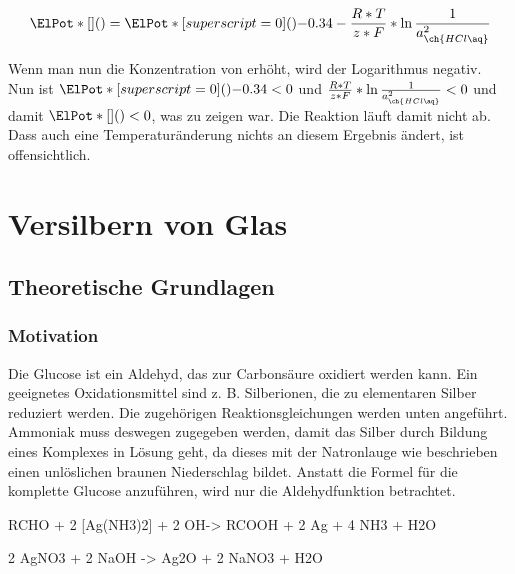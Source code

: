 \documentclass{article}
\begin{document}
      \begin{equation}
        \ElPot*[](){} = \ElPot*[superscript=0](){-0.34} - \frac{R*T}{z*F} * \ln {\frac{1}{a_{\ch{HCl\aq}}^2}} \label{eq:NernstzweiCu}
      \end{equation}
      
      Wenn man nun die Konzentration von  erhöht, wird der Logarithmus negativ. Nun ist $\ElPot*[superscript=0](){-0.34} < 0$ und $\frac{R*T}{z*F} * \ln {\frac{1}{a_{\ch{HCl\aq}}^2}} < 0$ und damit $\ElPot*[](){} < 0$, was zu zeigen war. Die Reaktion läuft damit nicht ab. Dass auch eine Temperaturänderung nichts an diesem Ergebnis ändert, ist offensichtlich.
      
  \pagebreak
  
  \section{Versilbern von Glas}
  
    \subsection{Theoretische Grundlagen}
      
      \subsubsection{Motivation}
      
        Die Glucose ist ein Aldehyd, das zur Carbonsäure oxidiert werden kann. Ein geeignetes Oxidationsmittel sind z. B.  Silberionen, die zu elementaren Silber reduziert werden. Die zugehörigen Reaktionsgleichungen werden unten angeführt. Ammoniak muss deswegen zugegeben werden, damit das Silber durch Bildung eines Komplexes in Lösung geht, da dieses mit der Natronlauge wie beschrieben einen unlöslichen braunen Niederschlag bildet. Anstatt die Formel für die komplette Glucose anzuführen, wird nur die Aldehydfunktion betrachtet.
        
        \begin{reaction}
          RCHO\aq{} + 2 [Ag(NH3)2]\pch\aq{} + 2 OH\mch\aq -> RCOOH\aq{} + 2 Ag\sld{} + 4 NH3\aq{} + H2O \\
        \end{reaction}
        
        \begin{reaction}
          2 AgNO3\aq{} + 2 NaOH\aq{} -> Ag2O\sld{} + 2 NaNO3\aq{} + H2O\\
        \end{reaction}
        
\end{document}
